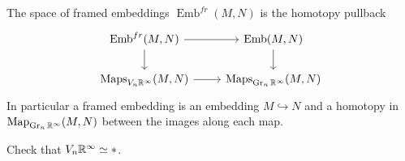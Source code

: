 \documentclass{amsart}
\DeclareMathOperator{\Emb}{Emb}
\begin{document}
\begin{definition}
    The space of framed embeddings $\Emb^{fr}(M,N)$ is the homotopy pullback
    \begin{equation*}
        \begin{tikzcd}
            \Emb^{fr}(M,N) \rar\dar & \Emb(M,N)\dar  \\
            \Maps_{V_n\R^\infty}(M,N) \rar & \Maps_{\Gr_n\R^\infty}(M,N)
        \end{tikzcd}
    \end{equation*}
    In particular a framed embedding is an embedding $M\hookrightarrow N$ and
    a homotopy in $\operatorname*{Map}_{\operatorname{Gr}_n\mathbb{R}^\infty}(M,N)$ between the images along each map.
\end{definition}

\begin{exercise}
    Check that $V_n\mathbb{R}^\infty\simeq *$.
\end{exercise}
\end{document}
